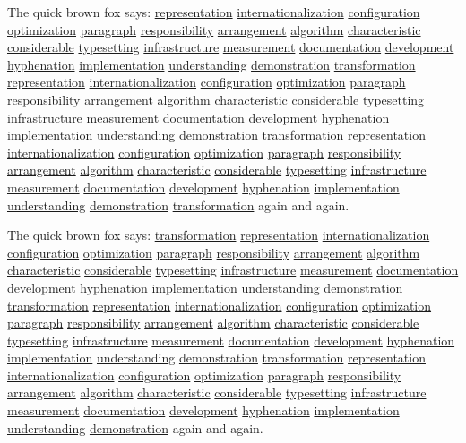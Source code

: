 \documentclass{article}
\begin{document}
The quick brown fox says: \underline{representation} \underline{internationalization} \underline{configuration} \underline{optimization} \underline{paragraph} \underline{responsibility} \underline{arrangement} \underline{algorithm} \underline{characteristic} \underline{considerable} \underline{typesetting} \underline{infrastructure} \underline{measurement} \underline{documentation} \underline{development} \underline{hyphenation} \underline{implementation} \underline{understanding} \underline{demonstration} \underline{transformation} \underline{representation} \underline{internationalization} \underline{configuration} \underline{optimization} \underline{paragraph} \underline{responsibility} \underline{arrangement} \underline{algorithm} \underline{characteristic} \underline{considerable} \underline{typesetting} \underline{infrastructure} \underline{measurement} \underline{documentation} \underline{development} \underline{hyphenation} \underline{implementation} \underline{understanding} \underline{demonstration} \underline{transformation} \underline{representation} \underline{internationalization} \underline{configuration} \underline{optimization} \underline{paragraph} \underline{responsibility} \underline{arrangement} \underline{algorithm} \underline{characteristic} \underline{considerable} \underline{typesetting} \underline{infrastructure} \underline{measurement} \underline{documentation} \underline{development} \underline{hyphenation} \underline{implementation} \underline{understanding} \underline{demonstration} \underline{transformation} again and again.

The quick brown fox says: \underline{transformation} \underline{representation} \underline{internationalization} \underline{configuration} \underline{optimization} \underline{paragraph} \underline{responsibility} \underline{arrangement} \underline{algorithm} \underline{characteristic} \underline{considerable} \underline{typesetting} \underline{infrastructure} \underline{measurement} \underline{documentation} \underline{development} \underline{hyphenation} \underline{implementation} \underline{understanding} \underline{demonstration} \underline{transformation} \underline{representation} \underline{internationalization} \underline{configuration} \underline{optimization} \underline{paragraph} \underline{responsibility} \underline{arrangement} \underline{algorithm} \underline{characteristic} \underline{considerable} \underline{typesetting} \underline{infrastructure} \underline{measurement} \underline{documentation} \underline{development} \underline{hyphenation} \underline{implementation} \underline{understanding} \underline{demonstration} \underline{transformation} \underline{representation} \underline{internationalization} \underline{configuration} \underline{optimization} \underline{paragraph} \underline{responsibility} \underline{arrangement} \underline{algorithm} \underline{characteristic} \underline{considerable} \underline{typesetting} \underline{infrastructure} \underline{measurement} \underline{documentation} \underline{development} \underline{hyphenation} \underline{implementation} \underline{understanding} \underline{demonstration} again and again.
\end{document}
